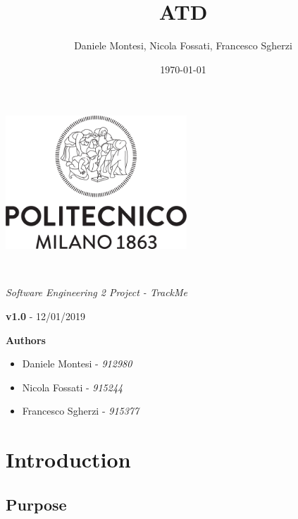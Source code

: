 \documentclass[a4paper,oneside,11pt]{article}
\title{ATD}
\author{Daniele Montesi, Nicola Fossati, Francesco Sgherzi}
\date{\today}
\begin{document}
    \begin{titlingpage} 
        \begin{center}
            \includegraphics[height=5cm]{assets/Logo_Politecnico_Milano.png}\\
            \vspace{4cm}
            \begin{huge} 
                \textbf{\thetitle} \\
            \end{huge}
            \vspace{0.3cm}
                    \begin{Large}
                \textit{Software Engineering 2 Project - TrackMe} \\
            \end{Large}
        \end{center}
         \textbf{v1.0} - 12/01/2019 \\

            \vspace{4cm}
             \begin{large}
            \textbf{Authors}
            \begin{itemize}
                \item Daniele Montesi - \textit{912980} 
                \item Nicola Fossati - \textit{915244}
                \item Francesco Sgherzi - \textit{915377}
            \end{itemize}
        \end{large}
    \end{titlingpage}
    \newpage
    \tableofcontents
    \newpage
    \section{Introduction}
    
        \subsection{Purpose}
            
\end{document}
